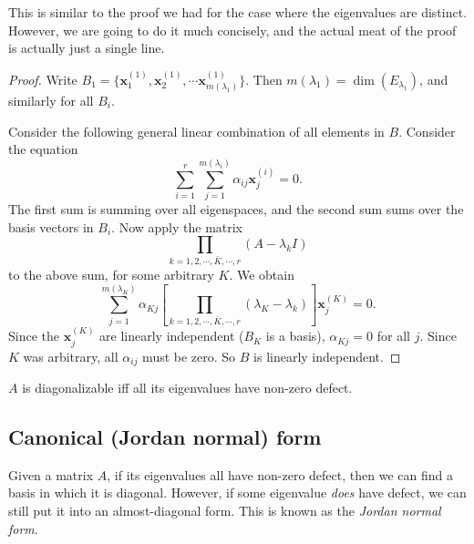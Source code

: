 \documentclass[a4paper]{article}
\begin{document}
This is similar to the proof we had for the case where the eigenvalues are distinct. However, we are going to do it much concisely, and the actual meat of the proof is actually just a single line.
\begin{proof}
  Write $B_1 = \{\mathbf{x}_1^{(1)}, \mathbf{x}_2^{(1)}, \cdots \mathbf{x}_{m(\lambda_1)}^{(1)}\}$. Then $m(\lambda_1) = \dim (E_{\lambda_1})$, and similarly for all $B_i$.

  Consider the following general linear combination of all elements in $B$. Consider the equation
  \[
    \sum_{i = 1}^r\sum_{j = 1}^{m(\lambda_i)} \alpha_{ij} \mathbf{x}_j^{(i)} = 0.
  \]
  The first sum is summing over all eigenspaces, and the second sum sums over the basis vectors in $B_i$. Now apply the matrix
  \[
    \prod_{k = 1, 2, \cdots, \bar{K}, \cdots, r} (A - \lambda_kI)
  \]
  to the above sum, for some arbitrary $K$. We obtain
  \[
    \sum_{j = 1}^{m(\lambda_K)}\alpha_{Kj}\left[\prod_{k = 1, 2, \cdots, \bar{K}, \cdots, r}(\lambda_K - \lambda_k)\right]\mathbf{x}_j^{(K)} = 0.
  \]
  Since the $\mathbf{x}^{(K)}_j$ are linearly independent ($B_K$ is a basis), $\alpha_{Kj} = 0$ for all $j$. Since $K$ was arbitrary, all $\alpha_{ij}$ must be zero. So $B$ is linearly independent.
\end{proof}

\begin{prop}
  $A$ is diagonalizable iff all its eigenvalues have non-zero defect.
\end{prop}
\subsection{Canonical (Jordan normal) form}
Given a matrix $A$, if its eigenvalues all have non-zero defect, then we can find a basis in which it is diagonal. However, if some eigenvalue \emph{does} have defect, we can still put it into an almost-diagonal form. This is known as the \emph{Jordan normal form}.
\end{document}
